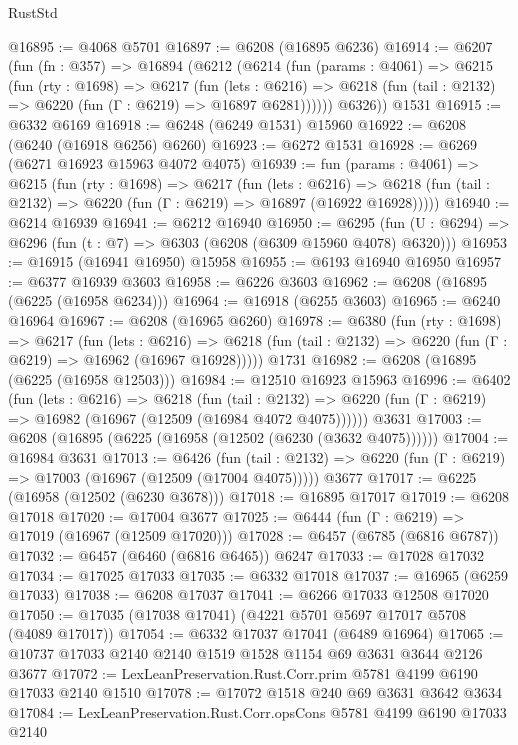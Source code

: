\begin{lexlean}{RustStd}
\begin{coremodule}
@16895 := @4068 @5701
@16897 := @6208 (@16895 @6236)
@16914 := @6207
    (fun (fn : @357) =>
    @16894
      (@6212
        (@6214
          (fun (params : @4061) =>
          @6215
            (fun (rty : @1698) =>
            @6217
              (fun (lets : @6216) =>
              @6218 (fun (tail : @2132) => @6220 (fun (Γ : @6219) => @16897 @6281))))))
        @6326))
    @1531
@16915 := @6332 @6169
@16918 := @6248 (@6249 @1531) @15960
@16922 := @6208 (@6240 (@16918 @6256) @6260)
@16923 := @6272 @1531
@16928 := @6269 (@6271 @16923 @15963 @4072 @4075)
@16939 := fun (params : @4061) =>
  @6215
    (fun (rty : @1698) =>
    @6217
      (fun (lets : @6216) =>
      @6218 (fun (tail : @2132) => @6220 (fun (Γ : @6219) => @16897 (@16922 @16928)))))
@16940 := @6214 @16939
@16941 := @6212 @16940
@16950 := @6295
    (fun (U : @6294) => @6296 (fun (t : @7) => @6303 (@6208 (@6309 @15960 @4078) @6320)))
@16953 := @16915 (@16941 @16950) @15958
@16955 := @6193 @16940 @16950
@16957 := @6377 @16939 @3603
@16958 := @6226 @3603
@16962 := @6208 (@16895 (@6225 (@16958 @6234)))
@16964 := @16918 (@6255 @3603)
@16965 := @6240 @16964
@16967 := @6208 (@16965 @6260)
@16978 := @6380
    (fun (rty : @1698) =>
    @6217
      (fun (lets : @6216) =>
      @6218 (fun (tail : @2132) => @6220 (fun (Γ : @6219) => @16962 (@16967 @16928)))))
    @1731
@16982 := @6208 (@16895 (@6225 (@16958 @12503)))
@16984 := @12510 @16923 @15963
@16996 := @6402
    (fun (lets : @6216) =>
    @6218
      (fun (tail : @2132) =>
      @6220 (fun (Γ : @6219) => @16982 (@16967 (@12509 (@16984 @4072 @4075))))))
    @3631
@17003 := @6208 (@16895 (@6225 (@16958 (@12502 (@6230 (@3632 @4075))))))
@17004 := @16984 @3631
@17013 := @6426
    (fun (tail : @2132) => @6220 (fun (Γ : @6219) => @17003 (@16967 (@12509 (@17004 @4075)))))
    @3677
@17017 := @6225 (@16958 (@12502 (@6230 @3678)))
@17018 := @16895 @17017
@17019 := @6208 @17018
@17020 := @17004 @3677
@17025 := @6444 (fun (Γ : @6219) => @17019 (@16967 (@12509 @17020)))
@17028 := @6457 (@6785 (@6816 @6787))
@17032 := @6457 (@6460 (@6816 @6465)) @6247
@17033 := @17028 @17032
@17034 := @17025 @17033
@17035 := @6332 @17018
@17037 := @16965 (@6259 @17033)
@17038 := @6208 @17037
@17041 := @6266 @17033 @12508 @17020
@17050 := @17035 (@17038 @17041) (@4221 @5701 @5697 @17017 @5708 (@4089 @17017))
@17054 := @6332 @17037 @17041 (@6489 @16964)
@17065 := @10737 @17033 @2140 @2140 @1519 @1528 @1154 @69 @3631 @3644 @2126 @3677
@17072 := LexLeanPreservation.Rust.Corr.prim @5781 @4199 @6190 @17033 @2140 @1510
@17078 := @17072 @1518 @240 @69 @3631 @3642 @3634
@17084 := LexLeanPreservation.Rust.Corr.opsCons @5781 @4199 @6190 @17033 @2140

\end{coremodule}
\end{lexlean}
